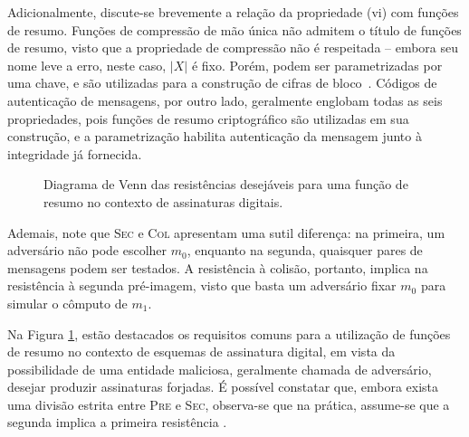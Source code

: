 \documentclass[12pt]{report}
\newcommand{\length}[1]{\vert #1 \vert}
\def\precircle{(0.00, 0) circle (1.25cm)}
\def\seccircle{(1.75, 0) circle (1.25cm)}
\def\colcircle{(1.75, 0) circle (0.75cm)}
\begin{document}
Adicionalmente, discute-se brevemente a relação da propriedade (vi) com
funções de resumo. Funções de compressão de mão única não admitem o título
de funções de resumo, visto que a propriedade de compressão não é respeitada
-- embora seu nome leve a erro, neste caso, $\length{X}$ é fixo. Porém, podem
ser parametrizadas por uma chave, e são utilizadas para a construção de cifras
de bloco~\cite[9.25]{Menezes:1996:HAC:548089}. Códigos de autenticação de
mensagens, por outro lado, geralmente englobam todas as seis propriedades,
pois funções de resumo criptográfico são utilizadas em sua construção,
e a parametrização habilita autenticação da mensagem junto à integridade já fornecida.

\begin{figure}[h]
  \centering
  \caption{Diagrama de Venn das resistências desejáveis para uma função de resumo
    no contexto de assinaturas digitais.}
  \label{fig:1}
\end{figure}

Ademais, note que \textsc{Sec} e \textsc{Col} apresentam uma sutil diferença: na
primeira, um adversário não pode escolher $m_0$, enquanto na segunda, quaisquer
pares de mensagens podem ser testados. A resistência à colisão, portanto,
implica na resistência à segunda pré-imagem, visto que basta um adversário
fixar $m_0$ para simular o cômputo de $m_1$. 

Na Figura \ref{fig:1}, estão destacados os requisitos comuns para a utilização
de funções de resumo no contexto de esquemas de assinatura
digital, em vista da possibilidade de uma entidade maliciosa, geralmente
chamada de adversário, desejar produzir assinaturas forjadas. É possível
constatar que, embora exista uma divisão estrita entre \textsc{Pre} e
\textsc{Sec}, observa-se que na prática, assume-se que a segunda
implica a primeira resistência \cite[9.20]{Menezes:1996:HAC:548089}.
\end{document}
